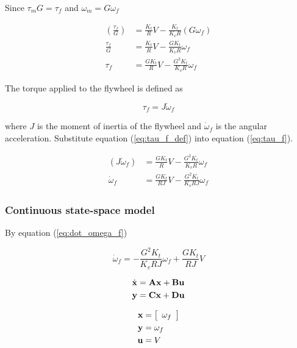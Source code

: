 Since $\tau_m G = \tau_f$ and $\omega_m = G \omega_f$

\begin{align}
  \left(\frac{\tau_f}{G}\right) &= \frac{K_t}{R} V -
    \frac{K_t}{K_v R} (G \omega_f) \nonumber \\
  \frac{\tau_f}{G} &= \frac{K_t}{R} V - \frac{G K_t}{K_v R} \omega_f \nonumber
    \\
  \tau_f &= \frac{G K_t}{R} V - \frac{G^2 K_t}{K_v R} \omega_f \label{eq:tau_f}
\end{align}

The torque applied to the flywheel is defined as

\begin{equation}
  \tau_f = J \dot{\omega}_f \label{eq:tau_f_def}
\end{equation}

where $J$ is the moment of inertia of the flywheel and $\dot{\omega}_f$ is the
angular acceleration. Substitute equation (\ref{eq:tau_f_def}) into equation
(\ref{eq:tau_f}).

\begin{align}
  (J \dot{\omega}_f) &= \frac{G K_t}{R} V - \frac{G^2 K_t}{K_v R} \omega_f
    \nonumber \\
  \dot{\omega}_f &= \frac{G K_t}{RJ} V - \frac{G^2 K_t}{K_v RJ} \omega_f
    \label{eq:dot_omega_f}
\end{align}

\subsubsection{Continuous state-space model}

By equation (\ref{eq:dot_omega_f})

\begin{equation*}
  \dot{\omega}_f = -\frac{G^2 K_t}{K_v RJ} \omega_f + \frac{G K_t}{RJ} V
\end{equation*}

\begin{align*}
  \dot{\mathbf{x}} &= \mathbf{A} \mathbf{x} + \mathbf{B} \mathbf{u} \\
  \mathbf{y} &= \mathbf{C} \mathbf{x} + \mathbf{D} \mathbf{u}
\end{align*}

\begin{align*}
  \mathbf{x} &= \left[
  \begin{array}{c}
    \omega_f
  \end{array}
  \right] \\
  \mathbf{y} &= \omega_f \\
  \mathbf{u} &= V
\end{align*}


